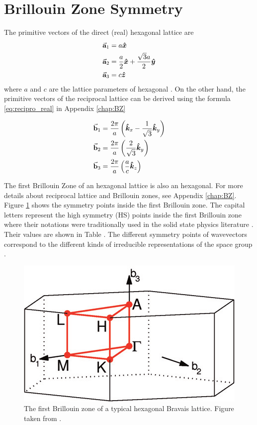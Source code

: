 \section{Brillouin Zone Symmetry}
	The primitive vectors of the direct (real) hexagonal lattice are 
\begin{align}
	\va{a}_1 &= a \vu*{x}	\\
	\va{a}_2 &= \frac{a}{2} \vu*{x} + \frac{\sqrt{3}a}{2} \vu*{y} \\
	\va{a}_3 &= c \vu*{z}
\end{align}
where $a$ and $c$ are the lattice parameters of hexagonal . On the other hand, the primitive vectors of the reciprocal lattice can be derived using the formula \eqref{eq:recipro_real} in Appendix \ref{chap:BZ} 

\begin{align}
	\va{b}_1 &= \frac{2 \pi}{a} \left(\vu*{k}_x - \frac{1}{\sqrt{3}} \vu*{k}_y \right) \\ 
	\va{b}_2 &= \frac{2 \pi}{a} \left( \frac{2}{\sqrt{3}} \vu*{k}_y \right) \\
	\va{b}_3 &= \frac{2 \pi}{a} \left( \frac{a}{c} \vu*{k}_z  \right)
\end{align}

The first Brillouin Zone of an hexagonal lattice is also an hexagonal. For more details about reciprocal lattice and Brillouin zones, see Appendix \ref{chap:BZ}.  Figure \ref{fig:HS} shows the symmetry points inside the first Brillouin zone. The capital letters represent the high symmetry (HS) points inside the first Brillouin zone where their notations were traditionally used in the solid state physics literature \citep{Bouckaert1936}. Their  values are shown in Table .  The different symmetry points of wavevectors correspond to the different kinds of irreducible representations of the space group \citep{Shmueli2001,Aroyo2006,PerezMato2011,Aroyo2014}. 

\begin{figure}[tbh!] 
	\centering
	\includegraphics[width=0.48\linewidth]{"images/rrl/hex"}
	\caption[The first Brillouin zone of a typical hexagonal Bravais lattice]{The first Brillouin zone of a typical hexagonal Bravais lattice. Figure taken from \citep{Setyawan2010}.}
	\label{fig:HS}
\end{figure}



